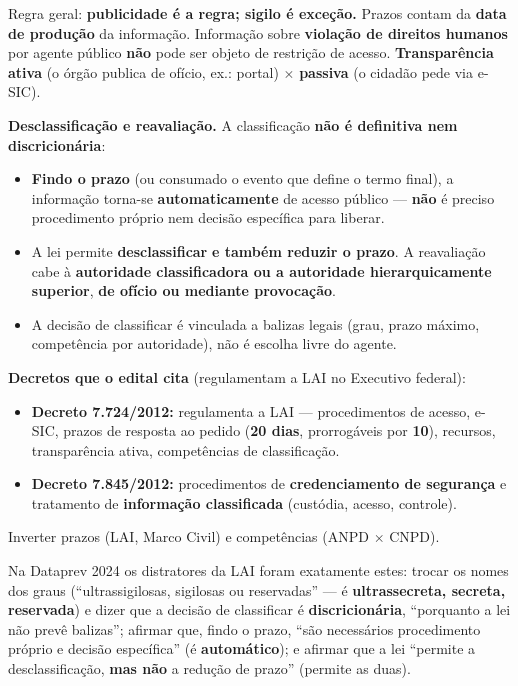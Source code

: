 Regra geral: \textbf{publicidade é a regra; sigilo é exceção.} Prazos contam
da \textbf{data de produção} da informação. Informação sobre
\textbf{violação de direitos humanos} por agente público \textbf{não} pode
ser objeto de restrição de acesso. \textbf{Transparência ativa} (o órgão
publica de ofício, ex.: portal) $\times$ \textbf{passiva} (o cidadão pede via
e-SIC).

\textbf{Desclassificação e reavaliação.} A classificação \textbf{não é
definitiva nem discricionária}:

\begin{itemize}
\item \textbf{Findo o prazo} (ou consumado o evento que define o termo
final), a informação torna-se \textbf{automaticamente} de acesso público ---
\textbf{não} é preciso procedimento próprio nem decisão específica para
liberar.
\item A lei permite \textbf{desclassificar} \textbf{e também reduzir o
prazo}. A reavaliação cabe à \textbf{autoridade classificadora ou a
autoridade hierarquicamente superior}, \textbf{de ofício ou mediante
provocação}.
\item A decisão de classificar é vinculada a balizas legais (grau, prazo
máximo, competência por autoridade), não é escolha livre do agente.
\end{itemize}

\textbf{Decretos que o edital cita} (regulamentam a LAI no Executivo
federal):

\begin{itemize}
\item \textbf{Decreto 7.724/2012:} regulamenta a LAI --- procedimentos de
acesso, e-SIC, prazos de resposta ao pedido (\textbf{20 dias}, prorrogáveis
por \textbf{10}), recursos, transparência ativa, competências de
classificação.
\item \textbf{Decreto 7.845/2012:} procedimentos de \textbf{credenciamento
de segurança} e tratamento de \textbf{informação classificada} (custódia,
acesso, controle).
\end{itemize}

\begin{pegadinha}
Inverter prazos (LAI, Marco Civil) e competências (ANPD $\times$ CNPD).

Na Dataprev 2024 os distratores da LAI foram exatamente estes: trocar os
nomes dos graus (``ultrassigilosas, sigilosas ou reservadas'' --- é
\textbf{ultrassecreta, secreta, reservada}) e dizer que a decisão de
classificar é \textbf{discricionária}, ``porquanto a lei não prevê balizas'';
afirmar que, findo o prazo, ``são necessários procedimento próprio e decisão
específica'' (é \textbf{automático}); e afirmar que a lei ``permite a
desclassificação, \textbf{mas não} a redução de prazo'' (permite as duas).
\end{pegadinha}

